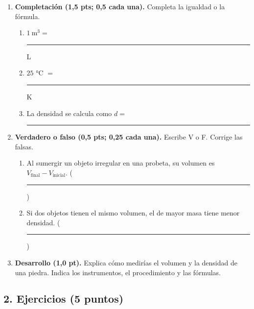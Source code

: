 \documentclass[12pt, letterpaper]{article}
\begin{document}
\begin{enumerate}[leftmargin=*, label=\textbf{\arabic*.}, itemsep=0.5em]
  \item \textbf{Completación (1,5 pts; 0,5 cada una).} Completa la igualdad o la fórmula.
        \begin{enumerate}[label=\alph*), leftmargin=1.8em, itemsep=0.4em]
          \item $1\ \text{m}^3 =$ \rule{2.2cm}{0.4pt} L
          \item $25$ °C $=$ \rule{2.2cm}{0.4pt} K
          \item La densidad se calcula como $d =$ \rule{2.2cm}{0.4pt}
        \end{enumerate}

  \item \textbf{Verdadero o falso (0,5 pts; 0,25 cada una).} Escribe V o F. Corrige las falsas.
        \begin{enumerate}[label=\alph*), leftmargin=1.8em, itemsep=0.45em]
          \item Al sumergir un objeto irregular en una probeta, su volumen es
                $V_{\text{final}}-V_{\text{inicial}}$. \hfill (\rule{0.6cm}{0.4pt})
          \item Si dos objetos tienen el mismo volumen, el de mayor masa tiene menor densidad.
                \hfill (\rule{0.6cm}{0.4pt})
        \end{enumerate}

  \item \textbf{Desarrollo (1,0 pt).} Explica cómo medirías el volumen y la densidad
        de una piedra. Indica los instrumentos, el procedimiento y las fórmulas.
        \vspace{2.4cm}
\end{enumerate}

\newpage
\subsection*{2. Ejercicios (5 puntos)}
\end{document}

